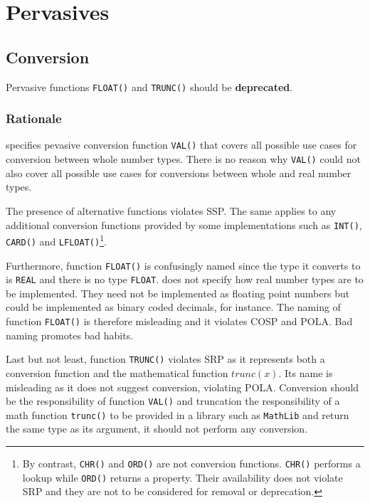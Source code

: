 \documentclass[10pt,a4paper]{article}
\begin{document}
\section{Pervasives}

\subsection{Conversion}

Pervasive functions \verb|FLOAT()| and \verb|TRUNC()| should be
\textbf{deprecated}.

\subsubsection{Rationale}

\cite{Wirth88} specifies pevasive conversion function \verb|VAL()| that covers
all possible use cases for conversion between whole number types. There is no
reason why \verb|VAL()| could not also cover all possible use cases for
conversions between whole and real number types.

The presence of alternative functions violates SSP. The same applies to any
additional conversion functions provided by some implementations such as
\verb|INT()|, \verb|CARD()| and \verb|LFLOAT()|\footnote{By contrast,
\texttt{CHR()} and \texttt{ORD()} are not conversion functions. \texttt{CHR()}
performs a lookup while \texttt{ORD()} returns a property. Their availability
does not violate SRP and they are not to be considered for removal or
deprecation.}.
 
Furthermore, function \verb|FLOAT()| is confusingly named since the type it
converts to is \verb|REAL| and there is no type \verb|FLOAT|. \cite{Wirth88}
does not specify how real number types are to be implemented. They need not be
implemented as floating point numbers but could be implemented as binary coded
decimals, for instance. The naming of function \verb|FLOAT()| is therefore
misleading and it violates COSP and POLA. Bad naming promotes bad habits.

Last but not least, function \verb|TRUNC()| violates SRP \cite{Martin03} as it
represents both a conversion function and the mathematical function $trunc(x)$.
Its name is misleading as it does not suggest conversion, violating POLA.
Conversion should be the responsibility of function \verb|VAL()| and truncation
the responsibility of a math function \verb|trunc()| to be provided in a
library such as \verb|MathLib| and return the same type as its argument, it
should not perform any conversion.
\end{document}
